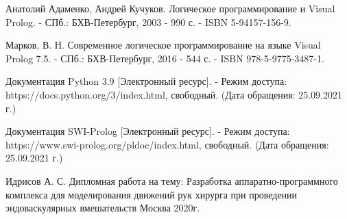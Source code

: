 \newpage

\begin{thebibliography}{3}
	Анатолий Адаменко, Андрей Кучуков. Логическое программирование и Visual Prolog. - СПб.: БХВ-Петербург, 2003 - 990 с. - ISBN 5-94157-156-9.
	
	Марков, В. Н. Современное логическое программирование на языке Visual Prolog 7.5. - СПб.: БХВ-Петербург, 2016 - 544 с. - ISBN 978-5-9775-3487-1.
	
	Документация Python 3.9 [Электронный ресурс]. - Режим доступа: https://docs.python.org/3/index.html, свободный. (Дата обращения: 25.09.2021 г.)
	
	Документация SWI-Prolog [Электронный ресурс]. - Режим доступа: https://www.swi-prolog.org/pldoc/index.html, свободный. (Дата обращения: 25.09.2021 г.)
	
	Идрисов А. С. Дипломная работа на тему: Разработка аппаратно-программного комплекса для моделирования движений рук хирурга при проведении эндоваскулярных вмешательств Москва 2020г.
	
\end{thebibliography}